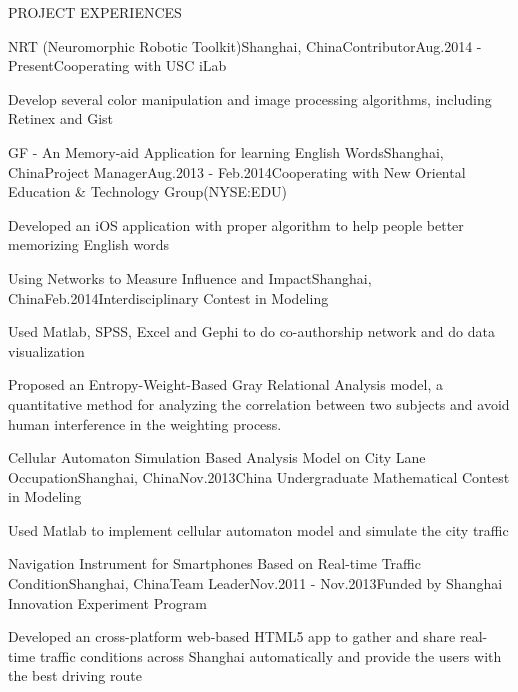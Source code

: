 \documentclass{resume} %
\begin{document}
\begin{rSection}{PROJECT EXPERIENCES}

  \begin{pSubsection}{NRT (Neuromorphic Robotic Toolkit)}{Shanghai, China}{Contributor}{Aug.2014 - Present}{Cooperating
    with USC iLab}
  \item Develop several color manipulation and image processing algorithms, including Retinex and Gist
  \end{pSubsection}

  \begin{pSubsection}{GF - An Memory-aid Application for learning English Words}{Shanghai,
    China}{Project Manager}{Aug.2013 - Feb.2014}{Cooperating with New Oriental Education \& Technology Group(NYSE:EDU) }
  \item Developed an iOS application with proper algorithm to help people better memorizing English words
  \end{pSubsection}

  \begin{pSubsection}{Using Networks to Measure Influence and Impact}{Shanghai,
  China}{}{Feb.2014}{Interdisciplinary Contest in Modeling}
  \item Used Matlab, SPSS, Excel and Gephi to do co-authorship network and do data visualization
  \item Proposed an Entropy-Weight-Based Gray Relational Analysis model, a quantitative method for
    analyzing the correlation between two subjects and avoid human interference in the
    weighting process.
  \end{pSubsection}

  \begin{pSubsection}{Cellular Automaton Simulation Based Analysis Model
  on City Lane Occupation}{Shanghai,
  China}{}{Nov.2013}{China Undergraduate Mathematical Contest in Modeling}
  \item Used Matlab to implement cellular automaton model and simulate the city traffic
  \end{pSubsection}

  \begin{pSubsection}{Navigation Instrument for Smartphones Based on Real-time Traffic Condition}{Shanghai,
    China}{Team Leader}{Nov.2011 - Nov.2013}{Funded by Shanghai Innovation Experiment Program}
  \item Developed an cross-platform web-based HTML5 app to gather and share real-time traffic conditions across
    Shanghai automatically and provide the users with the best driving route
  \end{pSubsection}


\end{rSection}
\end{document}
